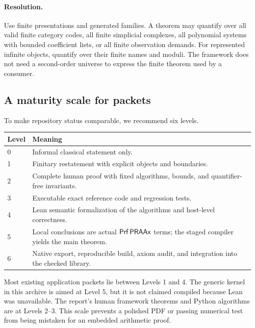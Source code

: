 \paragraph{Resolution.}
Use finite presentations and generated families.  A theorem may quantify over all valid finite category
codes, all finite simplicial complexes, all polynomial systems with bounded coefficient lists, or all
finite observation demands.  For represented infinite objects, quantify over their finite names and
moduli.  The framework does not need a second-order universe to express the finite theorem used by a
consumer.

\subsection{A maturity scale for packets}

To make repository status comparable, we recommend six levels.

\begin{longtable}{@{}p{}p{}@{}}
\toprule
Level & Meaning \\
\midrule
0 & Informal classical statement only. \\
1 & Finitary restatement with explicit objects and boundaries. \\
2 & Complete human proof with fixed algorithms, bounds, and quantifier-free invariants. \\
3 & Executable exact reference code and regression tests. \\
4 & Lean semantic formalization of the algorithms and host-level correctness. \\
5 & Local conclusions are actual \(\mathsf{Prf}\,\mathsf{PRAAx}\) terms; the staged compiler yields the main theorem. \\
6 & Native export, reproducible build, axiom audit, and integration into the checked library. \\
\bottomrule
\end{longtable}

Most existing application packets lie between Levels 1 and 4.  The generic kernel in this archive is aimed
at Level 5, but it is not claimed compiled because Lean was unavailable.  The report's human framework
theorems and Python algorithms are at Levels 2--3.  This scale prevents a polished PDF or passing numerical
test from being mistaken for an embedded arithmetic proof.
